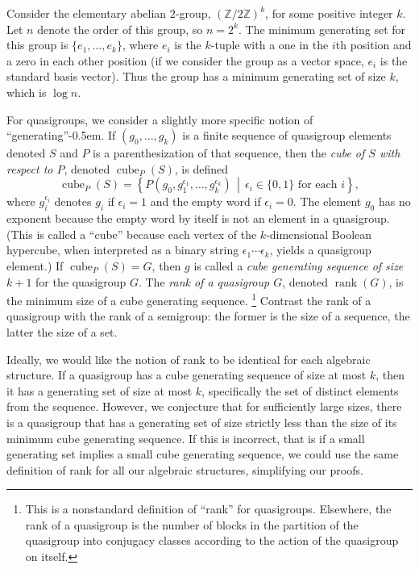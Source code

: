 \documentclass{article}
\newcommand{\todo}[1]{\textbf{TODO #1}}
\DeclareMathOperator{\cube}{cube}
\DeclareMathOperator{\rank}{rank}
\begin{document}
\begin{example}\label{ex:elementary}
  Consider the elementary abelian $2$-group, $(\mathbb{Z} / 2 \mathbb{Z})^k$, for some positive integer $k$.
  Let $n$ denote the order of this group, so $n = 2^k$.
  The minimum generating set for this group is $\{e_1, \dotsc, e_k\}$, where $e_i$ is the $k$-tuple with a one in the $i$th position and a zero in each other position (if we consider the group as a vector space, $e_i$ is the standard basis vector).
  Thus the group has a minimum generating set of size $k$, which is $\log n$.
\end{example}

For quasigroups, we consider a slightly more specific notion of ``generating''\kern-0.5em.
If $(g_0, \dotsc, g_k)$ is a finite sequence of quasigroup elements denoted $S$ and $P$ is a parenthesization of that sequence, then the \emph{cube of $S$ with respect to $P$}, denoted $\cube_P(S)$, is defined
\begin{equation*}
  \cube_P(S) = \left\{P(g_0, g_1^{\epsilon_1}, \dotsc, g_k^{\epsilon_k}) \, \middle| \, \epsilon_i \in \{0, 1\} \text{ for each } i \right\},
\end{equation*}
where $g_i^{\epsilon_i}$ denotes $g_i$ if $\epsilon_i = 1$ and the empty word if $\epsilon_i = 0$.
The element $g_0$ has no exponent because the empty word by itself is not an element in a quasigroup.
(This is called a ``cube'' because each vertex of the $k$-dimensional Boolean hypercube, when interpreted as a binary string $\epsilon_1 \dotsb \epsilon_k$, yields a quasigroup element.)
If $\cube_P(S) = G$, then $g$ is called a \emph{cube generating sequence of size $k + 1$} for the quasigroup $G$.
The \emph{rank of a quasigroup $G$}, denoted $\rank(G)$, is the minimum size of a cube generating sequence.%
\footnote{
  This is a nonstandard definition of ``rank'' for quasigroups.
  Elsewhere, the rank of a quasigroup is the number of blocks in the partition of the quasigroup into conjugacy classes according to the action of the quasigroup on itself.
}
Contrast the rank of a quasigroup with the rank of a semigroup: the former is the size of a sequence, the latter the size of a set.


Ideally, we would like the notion of rank to be identical for each algebraic structure.
If a quasigroup has a cube generating sequence of size at most $k$, then it has a generating set of size at most $k$, specifically the set of distinct elements from the sequence.
However, we conjecture that for sufficiently large sizes, there is a quasigroup that has a generating set of size strictly less than the size of its minimum cube generating sequence.
If this is incorrect, that is if a small generating set implies a small cube generating sequence, we could use the same definition of rank for all our algebraic structures, simplifying our proofs.
\end{document}
